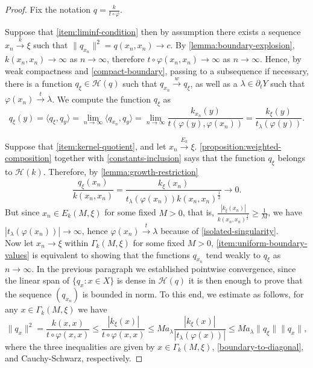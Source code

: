 \documentclass[leqno, final]{article}
\theoremstyle{definition}
\newcommand{\xto}[1]{\stackrel{#1}{\to}}
\newcommand{\Hilbert}{\mathcal{H}}
\newcommand{\rand}{\partial}
\renewcommand{\phi}{\varphi}
\newcommand{\la}{\langle}
\newcommand{\ra}{\rangle}
\begin{document}
\begin{proof}
Fix the notation $q=\frac{k}{t\circ{\phi}}$.

Suppose that \ref{item:liminf-condition} then by assumption there exists a
sequence $x_n\xto{k}\xi$ such that $\|q_{x_n}\|^2 = q(x_n,x_n)\to c$. By
\cref{lemma:boundary-explosion}, $k(x_n,x_n)\to\infty$ as $n\to\infty$,
therefore $t\circ\phi(x_n,x_n)\to\infty$ as $n\to\infty$. Hence, by weak
compactness and \ref{compact-boundary}, passing to a subsequence if
necessary, there is a function $q_\xi\in\Hilbert(q)$ such that $q_{x_n}\xto{w}q_\xi$,
as well as a $\lambda\in\rand_tY$ such that $\phi(x_n)\xto{t}\lambda$. We
compute the function $q_\xi$ as \begin{equation}\label{equation:qxi-computation}
	q_\xi(y)
	= \la q_\xi, q_y\ra
	= \lim_{n\to\infty}\la q_{x_n}, q_y\ra
	= \lim_{n\to\infty}\frac{k_{x_n}(y)}{t(\phi(y),\phi(x_n))}
	= \frac{k_\xi(y)}{t_\lambda(\phi(y))}.
\end{equation}

Suppose that \ref{item:kernel-quotient}, and let $x_n\xto{E_k}\xi$.
\cref{proposition:weighted-composition} together with \ref{constants-inclusion}
says that the function $q_\xi$ belongs to $\Hilbert(k)$. Therefore, by \cref{lemma:growth-restriction} \[
	\frac{q_\xi(x_n)}{k(x_n,x_n)}
	= \frac{k_\xi(x_n)}{t_\lambda(\phi(x_n))k(x_n,x_n)^\frac12}
	\to 0.
\]
But since $x_n\in E_k(M,\xi)$ for some fixed $M>0$, that is,
$\frac{|k_\xi(x_n)|}{k(x_n,x_n)^\frac12}\geq\frac1M$, we have
$|t_\lambda(\phi(x_n))| \to \infty$, hence $\phi(x_n)\xto{t}\lambda$
because of \ref{isolated-singularity}.
\\ Now let $x_n\to\xi$ within $\Gamma_k(M,\xi)$ for some fixed $M>0$,
\ref{item:uniform-boundary-values} is equivalent to showing that the
functions $q_{x_n}$ tend weakly to $q_\xi$ as $n\to\infty$. In the previous
paragraph we established pointwise convergence, since the linear span of
$\{q_x:x\in X\}$ is dense in $\Hilbert(q)$ it is then enough to prove that the
sequence $(q_{x_n})$ is bounded in norm. To this end, we estimate as follows,
for any $x\in\Gamma_k(M,\xi)$ we have \begin{equation}\label{equation:c-norm-estimate}
	\|q_{x}\|^2
	= \frac{k(x,x)}{t\circ\phi(x,x)}
	\leq \frac{|k_\xi(x)|}{t\circ\phi(x,x)}
	\leq Ma_\lambda\frac{|k_\xi(x)|}{|t_\lambda(\phi(x))|}
	\leq Ma_\lambda\|q_\xi\|\|q_x\|,
\end{equation}
where the three inequalities are given by $x\in\Gamma_k(M,\xi)$,
\ref{boundary-to-diagonal}, and Cauchy-Schwarz, respectively.


\end{proof}
\end{document}
